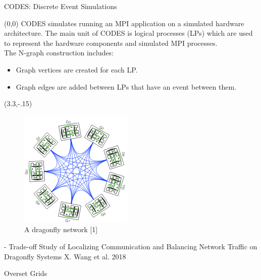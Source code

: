\documentclass{beamer}
\begin{document}
\begin{textblock}{15.6}
\begin{textblock}{5.2}
\begin{block}{\centering CODES: Discrete Event Simulations}
      \begin{textblock}{3.3}(0,0)
      CODES simulates running an MPI application on a simulated
      hardware architecture. The main unit of CODES is logical processes (LPs) which are used
      to represent the hardware components and simulated MPI processes. \\[.2cm]
      The N-graph construction includes:
      \begin{itemize}
      \item Graph vertices are created for each LP.
      \item Graph edges are added between LPs that have an event between them.
      \end{itemize}

      \end{textblock}
      \begin{textblock}{2}(3.3,-.15)
        \begin{figure}
          \centering
          \includegraphics[width=.8\textwidth]{../figures/dragonfly.png}
          \caption{A dragonfly network [1]}
        \end{figure}
      \end{textblock}
      \vspace{13.6cm}
    \end{block}
    \vspace{-.7cm}
    {\fontsize{22}{23} - Trade-off Study of Localizing Communication and Balancing Network Traffic on Dragonfly Systems X. Wang et al. 2018
    }
    \begin{block}{\centering Overset Grids}

\end{block}
\end{textblock}
\end{textblock}
\end{document}
